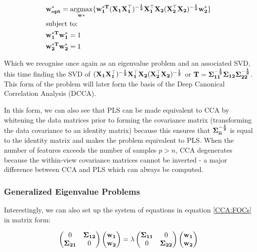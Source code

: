 \begin{align}
    & \bold{w^*_{opt}}=\underset{\bold{w*}}{\mathrm{argmax}}\{ \bold{w^{*T}_1(X_1X_1^{\top})^{-\frac{1}{2}}X_1^{\top}X_2(X_2^{\top}X_2)^{-\frac{1}{2}}w^*_2\}}\\
    & \text{subject to:} \notag\\
    & \bold{w^{*T}_1w^*_1}=1 \notag\\
    & \bold{w^{*T}_2w^*_2}=1 \notag
\end{align}

Which we recognise once again as an eigenvalue problem and an associated SVD, this time finding the SVD of $\bold{(X_1X_1^{\top})^{-\frac{1}{2}}X_1^{\top}X_2(X_2^{\top}X_2)^{-\frac{1}{2}}}$ or $\bold{T}=\bold{\Sigma^{-\frac{1}{2}}_{11}\Sigma_{12}\Sigma^{-\frac{1}{2}}_{22}}$. This form of the problem will later form the basis of the Deep Canonical Correlation Analysis (DCCA).

In this form, we can also see that PLS can be made equivalent to CCA by whitening the data matrices prior to forming the covariance matrix (transforming the data covariance to an identity matrix) because this ensures that $\bold{\Sigma^{-\frac{1}{2}}_{ii}}$ is equal to the identity matrix and makes the problem equivalent to PLS. When the number of features exceeds the number of samples $p>n$, CCA degenerates because the within-view covariance matrices cannot be inverted - a major difference between CCA and PLS which can always be computed.

\subsubsection{Generalized Eigenvalue Problems}

Interestingly, we can also set up the system of equations in equation \ref{CCA:FOCs} in matrix form:

\begin{align}
    \begin{pmatrix}
    0 & \bold{\Sigma_{12}}\\
    \bold{\Sigma_{21}} & 0
    \end{pmatrix}
    \begin{pmatrix}
    \bold{w_1}\\
    \bold{w_2}
    \end{pmatrix}
    =
    \lambda
    \begin{pmatrix}
    \bold{\Sigma_{11}} & 0\\
    0 & \bold{\Sigma_{22}}
    \end{pmatrix}
    \begin{pmatrix}
    \bold{w_1}\\
    \bold{w_2}
    \end{pmatrix}
\end{align}

